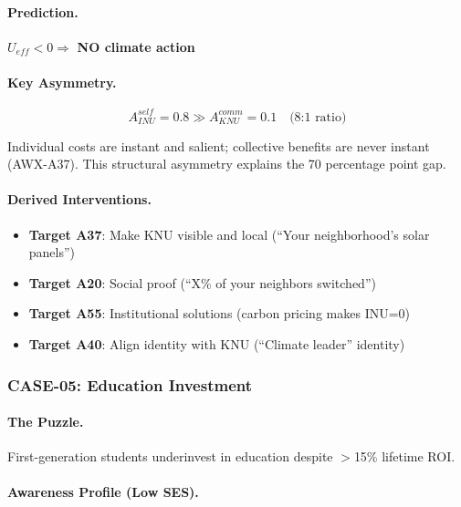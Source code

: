 \paragraph{Prediction.}
$U_{eff} < 0 \Rightarrow$ \textbf{NO climate action}

\paragraph{Key Asymmetry.}
\begin{equation}
A^{self}_{INU} = 0.8 \gg A^{comm}_{KNU} = 0.1 \quad \text{(8:1 ratio)}
\end{equation}

Individual costs are instant and salient; collective benefits are never instant (AWX-A37). This structural asymmetry explains the 70 percentage point gap.

\paragraph{Derived Interventions.}
\begin{itemize}
    \item \textbf{Target A37}: Make KNU visible and local (``Your neighborhood's solar panels'')
    \item \textbf{Target A20}: Social proof (``X\% of your neighbors switched'')
    \item \textbf{Target A55}: Institutional solutions (carbon pricing makes INU=0)
    \item \textbf{Target A40}: Align identity with KNU (``Climate leader'' identity)
\end{itemize}


\subsubsection{CASE-05: Education Investment}

\paragraph{The Puzzle.}
First-generation students underinvest in education despite $>$15\% lifetime ROI.

\paragraph{Awareness Profile (Low SES).}

